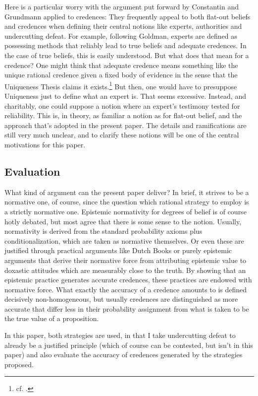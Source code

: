 \documentclass[11pt, a4paper]{scrartcl}
\begin{document}
Here is a particular worry with the argument put forward by Constantin and Grundmann applied to credences: They frequently appeal to both flat-out beliefs and credences when defining their central notions like experts, authorities and undercutting defeat. For example, following Goldman, experts are defined as possessing methods that reliably lead to true beliefs and adequate credences. In the case of true beliefs, this is easily understood. But what does that mean for a credence? One might think that adequate credence means something like the unique rational credence given a fixed body of evidence in the sense that the Uniqueness Thesis claims it exists.\footnote{cf. \textcite{Feldman2007-FELRRD}.} But then, one would have to presuppose Uniqueness just to define what an expert is. That seems excessive. Instead, and charitably, one could suppose a notion where an expert's testimony tested for reliability. This is, in theory, as familiar a notion as for flat-out belief, and the approach that's adopted in the present paper. The details and ramifications are still very much unclear, and to clarify these notions will be one of the central motivations for this paper.  

\subsection{Evaluation}

What kind of argument can the present paper deliver? In brief, it strives to be a normative one, of course, since the question which rational strategy to employ is a strictly normative one. Epistemic normativity for degrees of belief is of course hotly debated, but most agree that there is some sense to the notion. Usually, normativity is derived from the standard probability axioms plus conditionalization, which are taken as normative themselves. Or even these are justified through practical arguments like Dutch Books or purely epistemic arguments that derive their normative force from attributing epistemic value to doxastic attitudes which are measurably close to the truth. By showing that an epistemic practice generates accurate credences, these practices are endowed with normative force. What exactly the accuracy of a credence amounts to is defined decisively non-homogeneous, but usually credences are distinguished as more accurate that differ less in their probability assignment from what is taken to be the true value of a proposition. 

In this paper, both strategies are used, in that I take undercutting defeat to already be a justified principle (which of course can be contested, but isn't in this paper) and also evaluate the accuracy of credences generated by the strategies proposed. 
\end{document}
